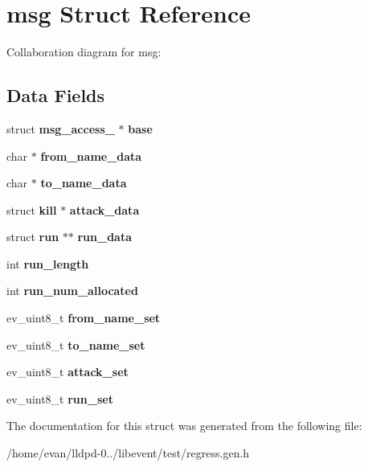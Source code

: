 \section{msg \-Struct \-Reference}
\label{structmsg}


\-Collaboration diagram for msg\-:
\subsection*{\-Data \-Fields}
\begin{DoxyCompactItemize}
\item 
struct {\bf msg\-\_\-access\-\_\-} $\ast$ {\bfseries base}\label{structmsg_a917e364c21c15889a9f4de611f27c5d6}

\item 
char $\ast$ {\bfseries from\-\_\-name\-\_\-data}\label{structmsg_addf0ef8abf06d580fb129d650fcdb8f3}

\item 
char $\ast$ {\bfseries to\-\_\-name\-\_\-data}\label{structmsg_abd8743e9c3e6d06864bc238ce2f4d7c9}

\item 
struct {\bf kill} $\ast$ {\bfseries attack\-\_\-data}\label{structmsg_a39687d78f3a2e732e35f94ea4ac868f4}

\item 
struct {\bf run} $\ast$$\ast$ {\bfseries run\-\_\-data}\label{structmsg_a9fa26a30e801696b6f0b721a6189ab27}

\item 
int {\bfseries run\-\_\-length}\label{structmsg_a69a779fb5671ab824d26fd77bf609148}

\item 
int {\bfseries run\-\_\-num\-\_\-allocated}\label{structmsg_a4bf636f072692f8eb74c6dad14f516dd}

\item 
ev\-\_\-uint8\-\_\-t {\bfseries from\-\_\-name\-\_\-set}\label{structmsg_a8deaa39ec3275490253cc02dcfdd9fa9}

\item 
ev\-\_\-uint8\-\_\-t {\bfseries to\-\_\-name\-\_\-set}\label{structmsg_a2ff64834c97c0f66c5df49f53f5a510d}

\item 
ev\-\_\-uint8\-\_\-t {\bfseries attack\-\_\-set}\label{structmsg_a6e7dd5f1ce2b9af4a8e9e5f8cfaaaf85}

\item 
ev\-\_\-uint8\-\_\-t {\bfseries run\-\_\-set}\label{structmsg_ab93c4747122aa4c57a0648af00da8863}

\end{DoxyCompactItemize}


\-The documentation for this struct was generated from the following file\-:\begin{DoxyCompactItemize}
\item 
/home/evan/lldpd-\/0../libevent/test/regress.\-gen.\-h\end{DoxyCompactItemize}
